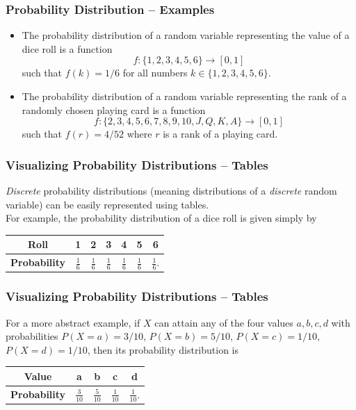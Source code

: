\documentclass[aspectratio=169,11pt,usenames,dvipsnames,handout]{beamer}
\begin{document}
\begin{frame}
 \frametitle{Probability Distribution -- Examples}
 \begin{itemize}
  \item The \alert{probability distribution} of a random variable representing
   the value of a dice roll is a function
   \[
    f: \{1,2,3,4,5,6\} \to [0,1]
   \]
   such that $f(k) = 1 / 6$ for all numbers $k \in \{1,2,3,4,5,6\}$.
  \pause
  \item The \alert{probability distribution} of a random variable representing
   the rank of a randomly chosen playing card is a function
   \pause
   \[
    f: \{2,3,4,5,6,7,8,9,10,J,Q,K,A\} \to [0,1]
   \]
   such that $f(r) = 4 / 52$ where $r$ is a rank of a playing card.
 \end{itemize}
\end{frame}

\begin{frame}
 \frametitle{Visualizing Probability Distributions -- Tables}
 \emph{Discrete} \alert{probability distributions} (meaning distributions of a
 \emph{discrete} random variable) can be easily represented using
 \alert{tables}.\\ \pause
 For example, the probability distribution of a dice roll is given simply by
 \begin{center}
  \begin{tabular}{c|cccccc}
   \textbf{Roll} & 1 & 2 & 3 & 4 & 5 & 6\\
   \midrule
   \textbf{Probability} & $\frac{1}{6}$ & $\frac{1}{6}$ &$\frac{1}{6}$
                        &$\frac{1}{6}$ &$\frac{1}{6}$ &$\frac{1}{6}$.
  \end{tabular}
 \end{center}
\end{frame}

\begin{frame}
 \frametitle{Visualizing Probability Distributions -- Tables}
 For a more abstract example, if $X$ can attain any of the four values $a,b,c,d$
 with probabilities $P(X = a) = 3 / 10$, $P(X = b) = 5 / 10$, $P(X = c) = 1 /
 10$, $P(X = d) = 1 / 10$, then its probability distribution is
 \begin{center}
  \begin{tabular}{c|cccc}
   \textbf{Value} & a & b & c & d\\
   \midrule
   \textbf{Probability} & $\frac{3}{10}$ & $\frac{5}{10}$ & $\frac{1}{10}$ &
   $\frac{1}{10}$.
  \end{tabular}
 \end{center}
\end{frame}
\end{document}
